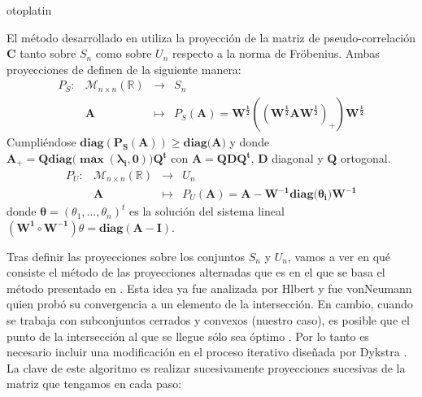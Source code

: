otoplatin\documentclass[a4paper,openright,12pt]{report}
\begin{document}
El método desarrollado en \cite{Higham2002} utiliza la proyección de la matriz de pseudo-correlación $\mathbf{C}$ tanto sobre $S_{n}$ como sobre $U_{n}$ respecto a la norma de Fröbenius. Ambas proyecciones de definen de la siguiente manera:
\begin{equation}
\begin{array}{cccc}
P_{S}: & \mathcal{M}_{n\times n}(\mathbb{R}) & \longrightarrow & S_{n}   \\
 & \mathbf{A} & \mapsto & P_{S}(\mathbf{A})=\mathbf{W^{\frac{1}{2}}}((\mathbf{W^{\frac{1}{2}}}\mathbf{A}\mathbf{W^{\frac{1}{2}}})_{+})\mathbf{W^{\frac{1}{2}}}
\end{array}
\label{proyeccion_S}
\end{equation}
Cumpliéndose $\mathbf{diag(P_{S}(\mathbf{A}))}\geq\mathbf{diag(\mathbf{A}})$ y donde $\mathbf{A_{+}}=\mathbf{Q}\mathbf{diag(\mathbf{\max(\lambda_{i},0)}})\mathbf{Q^{t}}$ con $\mathbf{A}=\mathbf{Q}\mathbf{D}\mathbf{Q^{t}}$, $\mathbf{D}$ diagonal y $\mathbf{Q}$ ortogonal.
\begin{equation}
\begin{array}{cccc}
P_{U}: & \mathcal{M}_{n\times n}(\mathbb{R}) & \longrightarrow & U_{n}   \\
 & \mathbf{A} & \mapsto & P_{U}(\mathbf{A})=\mathbf{A}-\mathbf{W^{-1}}\mathbf{diag(\theta_{i}})\mathbf{W^{-1}}
\end{array}
\label{proyeccion_U}
\end{equation}
donde $\mathbf{\theta}=(\theta_{1},\ldots,\theta_{n})^{t}$ es la solución del sistema lineal $(\mathbf{W^{1}}\circ\mathbf{W^{-1}})\theta=\mathbf{diag(A-I)}$.

Tras definir las proyecciones sobre los conjuntos $S_{n}$ y $U_{n}$, vamos a ver en qué consiste el método de las proyecciones alternadas que es en el que se basa el método presentado en \cite{Higham2002}. Esta idea ya fue analizada por Hlbert y fue vonNeumann quien probó su convergencia a un elemento de la intersección. En cambio, cuando se trabaja con subconjuntos cerrados y convexos (nuestro caso), es posible que el punto de la intersección al que se llegue sólo sea óptimo \cite{Han1988}. Por lo tanto es necesario incluir una modificación en el proceso iterativo diseñada por Dykstra \cite{Dykstra1983}. La clave de este algoritmo es realizar sucesivamente proyecciones sucesivas de la matriz que tengamos en cada paso:
\end{document}
